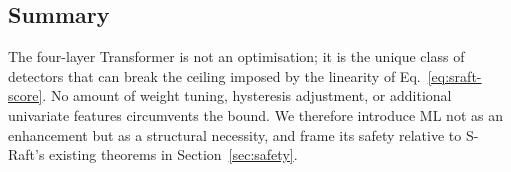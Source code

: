 \subsection{Summary}

The four-layer Transformer is not an optimisation; it is the unique
class of detectors that can break the ceiling imposed by the linearity
of Eq.~\eqref{eq:sraft-score}. No amount of weight tuning, hysteresis
adjustment, or additional univariate features circumvents the bound. We
therefore introduce ML not as an enhancement but as a structural
necessity, and frame its safety relative to S-Raft's existing theorems
in Section~\ref{sec:safety}.
